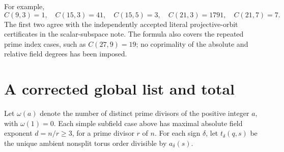 \documentclass[11pt,a4paper]{article}
\begin{document}
For example,
\[
 C(9,3)=1,\quad C(15,3)=41,\quad C(15,5)=3,\quad
 C(21,3)=1791,\quad C(21,7)=7.
\]
The first two agree with the independently accepted literal
projective-orbit certificates in the scalar-subspace note.
The formula also covers the repeated prime index cases, such
as $C(27,9)=19$; no coprimality of the absolute and relative
field degrees has been imposed.

\section{A corrected global list and total}
Let $\omega(a)$ denote the number of distinct prime divisors of
the positive integer $a$, with $\omega(1)=0$. Each simple
subfield case above has maximal absolute field exponent
$d=n/r\ge3$, for a prime divisor $r$ of $n$. For each sign
$\delta$, let $t_\delta(q,s)$ be the unique ambient nonsplit
torus order divisible by $a_\delta(s)$.
\end{document}

